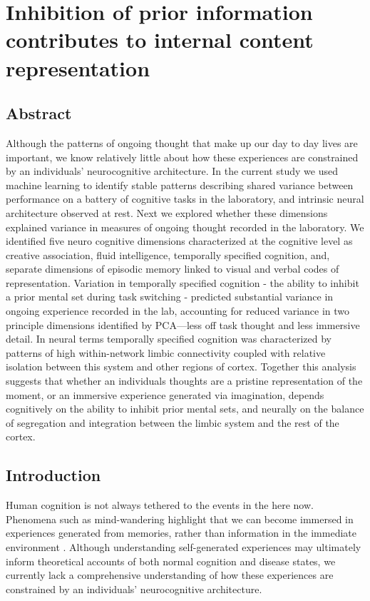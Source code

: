 \chapter{Inhibition of prior information contributes to internal content representation}
\label{ch:study3}
\section{Abstract}
Although the patterns of ongoing thought that make up our day to day lives are important, we know relatively little about how these experiences are constrained by an individuals’ neurocognitive architecture. In the current study we used machine learning to identify stable patterns describing shared variance between performance on a battery of cognitive tasks in the laboratory, and intrinsic neural architecture observed at rest. Next we explored whether these dimensions explained variance in measures of ongoing thought recorded in the laboratory. We identified five neuro cognitive dimensions characterized at the cognitive level as creative association, fluid intelligence, temporally specified cognition, and, separate dimensions of episodic memory linked to visual and verbal codes of representation. Variation in temporally specified cognition - the ability to inhibit a prior mental set during task switching - predicted substantial variance in ongoing experience recorded in the lab, accounting for reduced variance in two principle dimensions identified by PCA---less off task thought and less immersive detail. In neural terms temporally specified cognition was characterized by patterns of high within-network limbic connectivity coupled with relative isolation between this system and other regions of cortex. Together this analysis suggests that whether an individuals thoughts are a pristine representation of the moment, or an immersive experience generated via imagination, depends cognitively on the ability to inhibit prior mental sets, and neurally on the balance of segregation and integration between the limbic system and the rest of the cortex.

\section{Introduction}
\label{study3:intro}
Human cognition is not always tethered to the events in the here now. Phenomena such as mind-wandering highlight that we can become immersed in experiences generated from memories, rather than information in the immediate environment \cite{SmallwoodSchooler2015}. Although understanding self-generated experiences may ultimately inform theoretical accounts of both normal cognition and disease states, we currently lack a comprehensive understanding of how these experiences are constrained by an individuals’ neurocognitive architecture.

